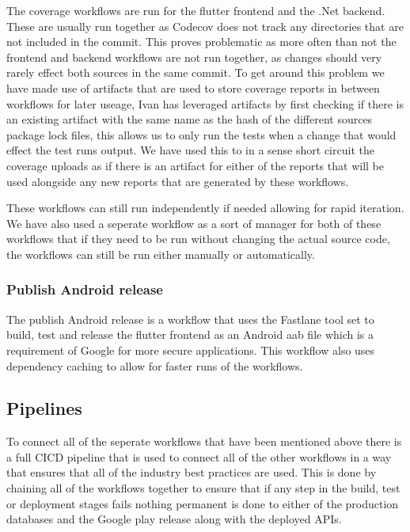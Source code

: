 \documentclass[a4paper]{article}
\begin{document}
The coverage workflows are run for the flutter frontend and the .Net backend. These are usually run 
together as Codecov does not track any directories that are not included in the commit. This proves 
problematic as more often than not the frontend and backend workflows are not run together, as 
changes should very rarely effect both sources in the same commit. To get around this problem 
we have made use of artifacts that are used to store coverage reports in between workflows for later
useage, Ivan has leveraged artifacts by first checking if there is an existing artifact with the 
same name as the hash of the different sources package lock files, this allows us to only run 
the tests when a change that would effect the test runs output. We have used this to in a sense 
short circuit the coverage uploads as if there is an artifact for either of the reports that will be 
used alongside any new reports that are generated by these workflows. 
\newline \newline

These workflows can still run independently if needed allowing for rapid iteration. We have also 
used a seperate workflow as a sort of manager for both of these workflows that if they need to be 
run without changing the actual source code, the workflows can still be run either manually or 
automatically.

\subsubsection{Publish Android release}

The publish Android release is a workflow that uses the Fastlane tool set to build, test and release 
the flutter frontend as an Android aab file which is a requirement of Google for more secure 
applications. This workflow also uses dependency caching to allow for faster runs of the workflows.

\subsection{Pipelines}

To connect all of the seperate workflows that have been mentioned above there 
is a full CICD pipeline that is used to connect all of the other workflows 
in a way that ensures that all of the industry best practices are used. This
is done by chaining all of the workflows together to ensure that if any step 
in the build, test or deployment stages fails nothing permanent is 
done to either of the production databases and the Google play release along with the 
deployed APIs. 
\newline \newline 
\end{document}
